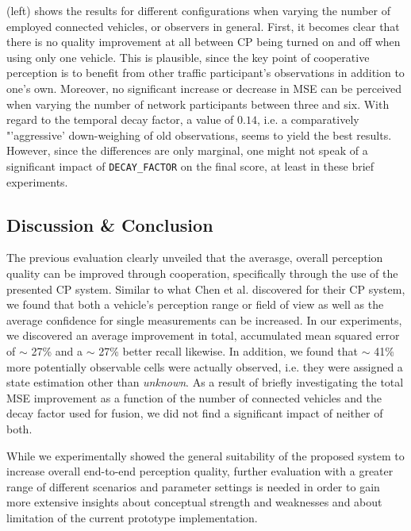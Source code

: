  (left) shows the results for different configurations when varying the number of employed connected vehicles, or observers in general. First, it becomes clear that there is no quality improvement at all between CP being turned on and off when using only one vehicle. This is plausible, since the key point of cooperative perception is to benefit from other traffic participant's observations in addition to one's own. Moreover, no significant increase or decrease in MSE can be perceived when varying the number of network participants between three and six. With regard to the temporal decay factor, a value of $0.14$, i.e. a comparatively "'aggressive' down-weighing of old observations, seems to yield the best results. However, since the differences are only marginal, one might not speak of a significant impact of \texttt{DECAY\_FACTOR} on the final score, at least in these brief experiments.

\subsection{Discussion \& Conclusion}
\label{subsec:evaluation:perception_evaluation:discussion_conclusion}
The previous evaluation clearly unveiled that the averasge, overall perception quality can be improved through cooperation, specifically through the use of the presented CP system. Similar to what Chen et al. \cite{Chen2019} discovered for their CP system, we found that both a vehicle's perception range or field of view as well as the average confidence for single measurements can be increased. In our experiments, we discovered an average improvement in total, accumulated mean squared error of $\sim$ 27\% and a $\sim$ 27\% better recall likewise. In addition, we found that $\sim$ 41\% more potentially observable cells were actually observed, i.e. they were assigned a state estimation other than \textit{unknown}. As a result of briefly investigating the total MSE improvement as a function of the number of connected vehicles and the decay factor used for fusion, we did not find a significant impact of neither of both.

While we experimentally showed the general suitability of the proposed system to increase overall end-to-end perception quality, further evaluation with a greater range of different scenarios and parameter settings is needed in order to gain more extensive insights about conceptual strength and weaknesses and about limitation of the current prototype implementation. 